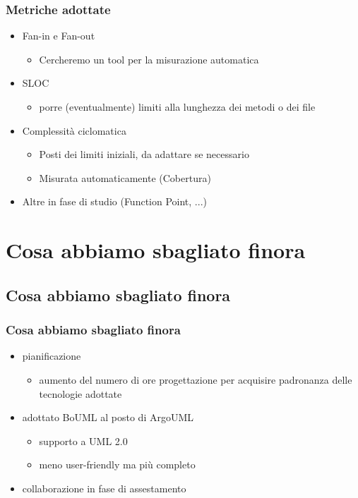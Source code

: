 \begin{frame}
\frametitle{Metriche adottate}
\begin{itemize}
	\item Fan-in e Fan-out
	\begin{itemize}
		\item Cercheremo un tool per la misurazione automatica
	\end{itemize}
	\item SLOC 
	\begin{itemize}
		\item porre (eventualmente) limiti alla lunghezza dei metodi o dei file
	\end{itemize}
	\item Complessità ciclomatica
	\begin{itemize}
		\item Posti dei limiti iniziali, da adattare se necessario
		\item Misurata automaticamente (Cobertura)
	\end{itemize}
	\item Altre in fase di studio (Function Point, ...)
\end{itemize}
\end{frame}


\section{Cosa abbiamo sbagliato finora}

\subsection*{Cosa abbiamo sbagliato finora}

\begin{frame}
\frametitle{Cosa abbiamo sbagliato finora}

\begin{itemize}
\item pianificazione
\begin{itemize}
	\item aumento del numero di ore progettazione per acquisire padronanza delle tecnologie adottate
\end{itemize}
\item adottato BoUML al posto di ArgoUML
\begin{itemize}
	\item supporto a UML 2.0
	\item meno user-friendly ma più completo
\end{itemize}
\item collaborazione in fase di assestamento
\end{itemize}

\end{frame}

